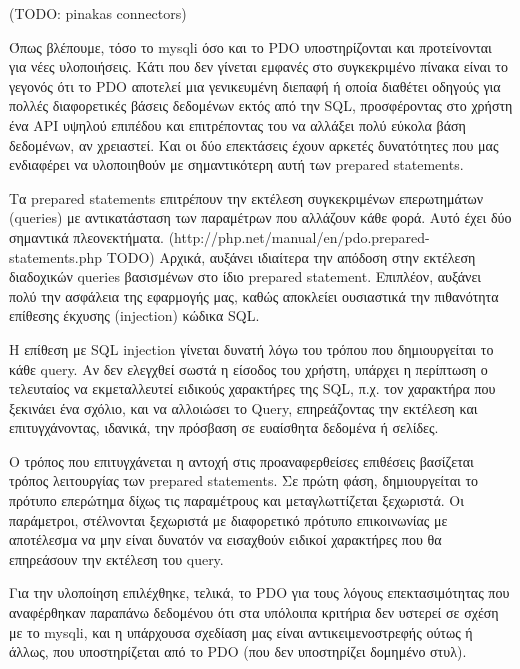 \documentclass[diploma]{softlab-thesis}
\begin{document}
(TODO: pinakas connectors)

\bigskip

Όπως βλέπουμε, τόσο το mysqli όσο και το PDO υποστηρίζονται και προτείνονται
για νέες υλοποιήσεις. Κάτι που δεν γίνεται εμφανές στο συγκεκριμένο πίνακα
είναι το γεγονός ότι το PDO αποτελεί μια γενικευμένη διεπαφή ή οποία διαθέτει
οδηγούς για πολλές διαφορετικές βάσεις δεδομένων εκτός από την SQL,
προσφέροντας στο χρήστη ένα API υψηλού επιπέδου και επιτρέποντας του να αλλάξει
πολύ εύκολα βάση δεδομένων, αν χρειαστεί. Και οι δύο επεκτάσεις έχουν αρκετές
δυνατότητες που μας ενδιαφέρει να υλοποιηθούν με σημαντικότερη αυτή των
prepared statements.

\bigskip

Τα prepared statements επιτρέπουν την εκτέλεση συγκεκριμένων επερωτημάτων
(queries) με αντικατάσταση των παραμέτρων που αλλάζουν κάθε φορά. Αυτό έχει δύο
σημαντικά πλεονεκτήματα. (http://php.net/manual/en/pdo.prepared-statements.php
TODO) Αρχικά, αυξάνει ιδιαίτερα την απόδοση στην εκτέλεση διαδοχικών queries
βασισμένων στο ίδιο prepared statement. Επιπλέον, αυξάνει πολύ την ασφάλεια της
εφαρμογής μας, καθώς αποκλείει ουσιαστικά την πιθανότητα επίθεσης έκχυσης
(injection) κώδικα SQL.

\bigskip

Η επίθεση με SQL injection γίνεται δυνατή λόγω του τρόπου που δημιουργείται το
κάθε query. Αν δεν ελεγχθεί σωστά η είσοδος του χρήστη, υπάρχει η περίπτωση ο
τελευταίος να εκμεταλλευτεί ειδικούς χαρακτήρες της SQL, π.χ. τον χαρακτήρα που
ξεκινάει ένα σχόλιο, και να αλλοιώσει το Query, επηρεάζοντας την εκτέλεση και
επιτυγχάνοντας, ιδανικά, την πρόσβαση σε ευαίσθητα δεδομένα ή σελίδες.

\bigskip

Ο τρόπος που επιτυγχάνεται η αντοχή στις προαναφερθείσες επιθέσεις βασίζεται
τρόπος λειτουργίας των prepared statements. Σε πρώτη φάση, δημιουργείται το
πρότυπο επερώτημα δίχως τις παραμέτρους και μεταγλωττίζεται ξεχωριστά. Οι
παράμετροι, στέλνονται ξεχωριστά με διαφορετικό πρότυπο επικοινωνίας με
αποτέλεσμα να μην είναι δυνατόν να εισαχθούν ειδικοί χαρακτήρες που θα
επηρεάσουν την εκτέλεση του query.

\bigskip

Για την υλοποίηση επιλέχθηκε, τελικά, το PDO για τους λόγους επεκτασιμότητας
που αναφέρθηκαν παραπάνω δεδομένου ότι στα υπόλοιπα κριτήρια δεν υστερεί σε
σχέση με το mysqli, και η υπάρχουσα σχεδίαση μας είναι αντικειμενοστρεφής ούτως
ή άλλως, που υποστηρίζεται από το PDO (που δεν υποστηρίζει δομημένο στυλ).
\end{document}
